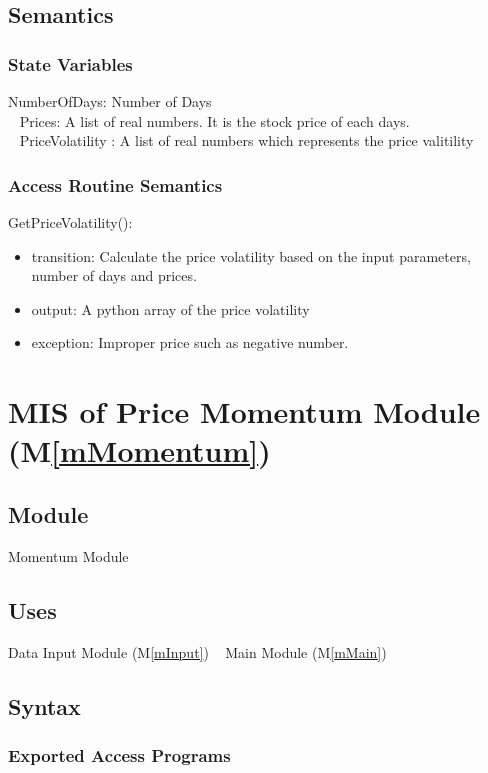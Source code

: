 \documentclass[12pt, titlepage]{article}
\newcommand{\mref}[1]{M\ref{#1}}
\begin{document}
\subsection{Semantics}
\subsubsection{State Variables}
NumberOfDays: Number of Days\\ 
~\newline
Prices: A list of real numbers. It is the stock price of each days.\\
~\newline
PriceVolatility : A list of real numbers which represents the price valitility\\

\subsubsection{Access Routine Semantics}

\noindent GetPriceVolatility():
\begin{itemize}
\item transition: Calculate the price volatility based on the input parameters, number of days and prices.
\item output: A python array of the price volatility
\item exception: Improper price such as negative number.
\end{itemize}


\section{MIS of Price Momentum Module (\mref{mMomentum}) } 

\subsection{Module}
Momentum Module
\subsection{Uses}
Data Input Module (\mref{mInput})
~\newline
Main Module (\mref{mMain})
\subsection{Syntax}

\subsubsection{Exported Access Programs}
\end{document}
